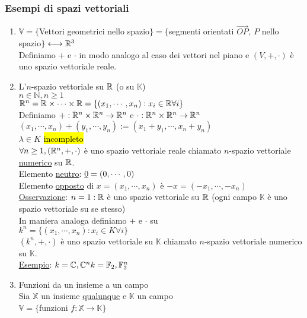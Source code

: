 \documentclass{article}
\begin{document}
\subsubsection*{Esempi di spazi vettoriali}
\begin{enumerate}
	\item $\mathbb{V}=\{$Vettori geometrici nello spazio$\}=\{$segmenti orientati $\vec{OP},\ P$ nello spazio$\}\longleftrightarrow\mathbb{R}^3$\\
	      Definiamo $+$ e $\cdot$ in modo analogo al caso dei vettori nel piano e $(V,+,\cdot)$ è uno spazio vettoriale reale.
	\item L'$n$-spazio vettoriale su $\mathbb{R}$ (o su $\mathbb{K}$)\\
	      $n\in\mathbb{N},n\ge1$\\
	      $\mathbb{R}^n=\mathbb{R}\times\cdots\times\mathbb{R}=\{(x_1,\cdots,x_n):x_i\in\mathbb{R}\forall i\}$\\
	      Definiamo $+:\mathbb{R}^n\times\mathbb{R}^n\to\mathbb{R}^n$ e $\cdot:\mathbb{R}^n\times\mathbb{R}^n\to\mathbb{R}^n$\\
	      $(x_1,\cdots,x_n)+(y_1,\cdots,y_n):=(x_1+y_1,\cdots,x_n+y_n)$\\
	      $\lambda\in K$ \hl{incompleto}\\
	      $\forall n\ge1,(\mathbb{R}^n,+,\cdot)$ è uno spazio vettoriale reale chiamato $n$-spazio vettoriale \ul{numerico} su $\mathbb{R}$.\\
	      Elemento \ul{neutro}: $\underline{0}=(0,\cdots,0)$\\
	      Elemento \ul{opposto} di $x=(x_1,\cdots,x_n)$ è $-x=(-x_1,\cdots,-x_n)$\\
	      \ul{Osservazione}: $n=1:\mathbb{R}$ è uno spazio vettoriale su $\mathbb{R}$ (ogni campo $\mathbb{K}$ è uno spazio vettoriale su se stesso)\\
	      In maniera analoga definiamo $+$ e $\cdot$ su\\
	      $k^n=\{(x_1,\cdots,x_n):x_i\in K\forall i\}$\\
	      $(k^n,+,\cdot)$ è uno spazio vettoriale su $\mathbb{K}$ chiamato $n$-spazio vettoriale numerico su $\mathbb{K}$.\\
	      \ul{Esempio}: $k=\mathbb{C},\mathbb{C}^n\\k=\mathbb{F}_2,\mathbb{F}^n_2$
	\item Funzioni da un insieme a un campo\\
	      Sia $\mathbb{X}$ un insieme \ul{qualunque} e $\mathbb{K}$ un campo\\
	      $\mathbb{V}=\{$funzioni $f:\mathbb{X}\to\mathbb{K}\}$
	      \begin{itemize}

\end{itemize}
\end{enumerate}
\end{document}
